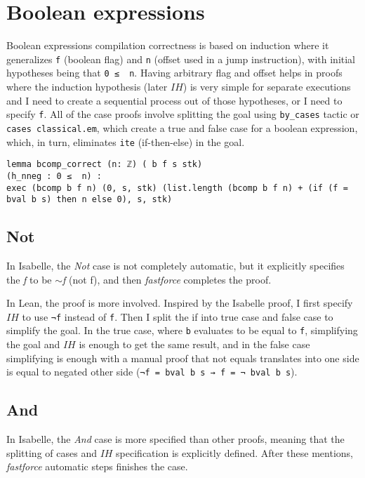 \section{Boolean expressions}
Boolean expressions compilation correctness is based on induction where it generalizes \lstinline{f} (boolean flag) and \lstinline{n} (offset used in a jump instruction), with initial hypotheses being that \lstinline{0 ≤  n}. Having arbitrary flag and offset helps in proofs where the induction hypothesis (later $IH$) is very simple for separate executions and I need to create a sequential process out of those hypotheses, or I need to specify \lstinline{f}. All of the case proofs involve splitting the goal using \lstinline{by_cases} tactic or \lstinline{cases classical.em}, which create a true and false case for a boolean expression, which, in turn, eliminates \lstinline{ite} (if-then-else) in the goal.

\begin{lstlisting}
lemma bcomp_correct (n: ℤ) ( b f s stk)
(h_nneg : 0 ≤  n) :
exec (bcomp b f n) (0, s, stk) (list.length (bcomp b f n) + (if (f = bval b s) then n else 0), s, stk)
\end{lstlisting}

\subsection{Not}
In Isabelle, the \emph{Not} case is not completely automatic, but it explicitly specifies the \emph{f} to be \emph{$\sim$f} (not f), and then \emph{fastforce} completes the proof.

In Lean, the proof is more involved. Inspired by the Isabelle proof, I first specify $IH$ to use \lstinline{¬f} instead of \lstinline{f}. Then I split the if into true case and false case to simplify the goal. In the true case, where \lstinline{b} evaluates to be equal to \lstinline{f}, simplifying the goal and $IH$ is enough to get the same result, and in the false case simplifying is enough with a manual proof that not equals translates into one side is equal to negated other side (\lstinline{¬f = bval b s → f = ¬ bval b s}).

\subsection{And}
In Isabelle, the \emph{And} case is more specified than other proofs, meaning that the splitting of cases and $IH$ specification is explicitly defined. After these mentions, \emph{fastforce} automatic steps finishes the case.

